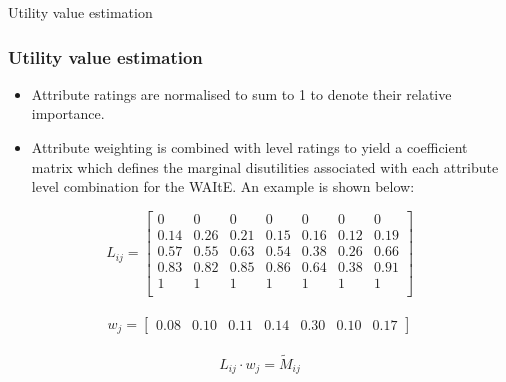 \documentclass[t,compress,9pt,aspectratio=169]{beamer}
\begin{document}
\begin{frame}{Utility value estimation}
    \frametitle{Utility value estimation}
    \begin{itemize}
        \item Attribute ratings are normalised to sum to 1 to denote their relative importance.
        \item Attribute weighting is combined with level ratings to yield a coefficient matrix which defines the marginal disutilities associated with each attribute level combination for the WAItE. An example is shown below:
    \end{itemize}
    
\begin{equation}\label{level_matrix}
L_{ij} = 
\begin{bmatrix}
0 & 0 & 0 & 0 & 0 & 0 & 0 \\
0.14 & 0.26 & 0.21 & 0.15 & 0.16 & 0.12 & 0.19 \\
0.57 & 0.55 & 0.63 & 0.54 & 0.38 & 0.26 & 0.66 \\
0.83 & 0.82 & 0.85 & 0.86 & 0.64 & 0.38 & 0.91 \\
1 & 1 & 1 & 1 & 1 & 1 & 1 \\
\end{bmatrix}
\end{equation}
\\
\begin{equation}\label{weight_vector}
w_j = \begin{bmatrix}
    0.08& 0.10& 0.11& 0.14& 0.30& 0.10& 0.17
\end{bmatrix} 
\end{equation}
\\

\begin{equation}\label{eq:element_wise_multiplication}
    L_{ij} \cdot  w_{j} = {\tilde{M}}_{ij}
\end{equation}

\end{frame}
\end{document}
